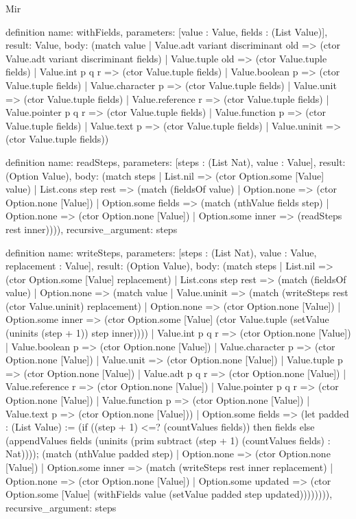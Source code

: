 \begin{lexlean}{Mir}
\begin{semanticmodule}
definition{
  name: withFields,
  parameters: [value : Value, fields : (List Value)],
  result: Value,
  body: (match value
    | Value.adt variant discriminant old => (ctor Value.adt variant discriminant fields)
    | Value.tuple old => (ctor Value.tuple fields)
    | Value.int p q r => (ctor Value.tuple fields)
    | Value.boolean p => (ctor Value.tuple fields)
    | Value.character p => (ctor Value.tuple fields)
    | Value.unit => (ctor Value.tuple fields)
    | Value.reference r => (ctor Value.tuple fields)
    | Value.pointer p q r => (ctor Value.tuple fields)
    | Value.function p => (ctor Value.tuple fields)
    | Value.text p => (ctor Value.tuple fields)
    | Value.uninit => (ctor Value.tuple fields))
}

definition{
  name: readSteps,
  parameters: [steps : (List Nat), value : Value],
  result: (Option Value),
  body: (match steps
    | List.nil => (ctor Option.some [Value] value)
    | List.cons step rest => (match (fieldsOf value)
      | Option.none => (ctor Option.none [Value])
      | Option.some fields => (match (nthValue fields step)
        | Option.none => (ctor Option.none [Value])
        | Option.some inner => (readSteps rest inner)))),
  recursive_argument: steps
}

definition{
  name: writeSteps,
  parameters: [steps : (List Nat), value : Value, replacement : Value],
  result: (Option Value),
  body: (match steps
    | List.nil => (ctor Option.some [Value] replacement)
    | List.cons step rest => (match (fieldsOf value)
      | Option.none => (match value
        | Value.uninit => (match (writeSteps rest (ctor Value.uninit) replacement)
          | Option.none => (ctor Option.none [Value])
          | Option.some inner => (ctor Option.some [Value] (ctor Value.tuple (setValue (uninits (step + 1)) step inner))))
        | Value.int p q r => (ctor Option.none [Value])
        | Value.boolean p => (ctor Option.none [Value])
        | Value.character p => (ctor Option.none [Value])
        | Value.unit => (ctor Option.none [Value])
        | Value.tuple p => (ctor Option.none [Value])
        | Value.adt p q r => (ctor Option.none [Value])
        | Value.reference r => (ctor Option.none [Value])
        | Value.pointer p q r => (ctor Option.none [Value])
        | Value.function p => (ctor Option.none [Value])
        | Value.text p => (ctor Option.none [Value]))
      | Option.some fields => (let padded : (List Value) := (if ((step + 1) <=? (countValues fields)) then fields else (appendValues fields (uninits (prim subtract (step + 1) (countValues fields) : Nat)))); (match (nthValue padded step)
        | Option.none => (ctor Option.none [Value])
        | Option.some inner => (match (writeSteps rest inner replacement)
          | Option.none => (ctor Option.none [Value])
          | Option.some updated => (ctor Option.some [Value] (withFields value (setValue padded step updated)))))))),
  recursive_argument: steps
}


\end{semanticmodule}
\end{lexlean}
